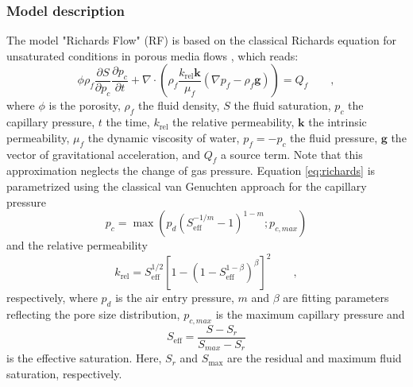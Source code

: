 \subsubsection{Model description}\label{sec:model_RF}
The model "Richards Flow" (RF) is based on the classical Richards equation for unsaturated conditions in porous media flows \cite{richards1931}, which reads:
\begin{equation}\label{eq:richards}
\phi \rho_f \frac{\partial S}{\partial p_c}\frac{\partial p_c}{\partial t} + \nabla \cdot \left(\rho_f \frac{k_\text{rel}\textbf{k}}{\mu_f}(\nabla p_f-\rho_f \textbf{g})\right)= Q_f \qquad ,
\end{equation}
where $\phi$ is the porosity, $\rho_f$ the fluid density, $S$ the fluid saturation, $p_c$ the capillary pressure, $t$ the time, $k_\text{rel}$ the relative permeability, $\textbf{k}$ the intrinsic permeability, $\mu_f$ the dynamic viscosity of water, $p_f=-p_c$ the fluid pressure, $\textbf{g}$ the vector of gravitational acceleration, and $Q_f$ a source term. Note that this approximation neglects the change of gas pressure. Equation \eqref{eq:richards} is parametrized using the classical van Genuchten approach  \cite{vangenuchten1980} for the capillary pressure
\begin{equation}\label{eq:cap_p}
p_c = \max \left(p_d\left(S_\text{eff}^{-1/m}-1\right)^{1-m};p_{c,max}\right)
\end{equation}
and the relative permeability 
\begin{equation}\label{eq:k_rel}
k_\text{rel}=S_\text{eff}^{1/2}\left[1-\left(1-S_\text{eff}^{1-\beta}\right)^\beta\right]^2 \qquad ,
\end{equation}
respectively, where $p_d$ is the air entry pressure, $m$ and $\beta$ are fitting parameters reflecting the pore size distribution, $p_{c,max}$ is the maximum capillary pressure and 
\begin{equation}
S_\text{eff}=\frac{S-S_r}{S_{max}-S_r}
\end{equation}
is the effective saturation. Here, $S_r$ and $S_\text{max}$ are the residual and maximum fluid saturation, respectively.

